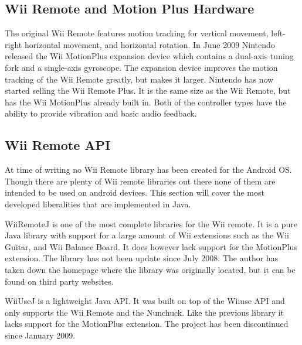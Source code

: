 \documentclass[11pt,twoside,a4paper]{report}
\begin{document}
\subsection{Wii Remote and Motion Plus Hardware}
The original Wii Remote features motion tracking for vertical movement, left-right horizontal movement, and horizontal rotation. %
In June 2009 %
Nintendo released the Wii MotionPlus expansion device which contains a dual-axis tuning fork and a single-axis gyroscope. %
The expansion device improves the motion tracking of the Wii Remote greatly, but makes it larger. Nintendo has now started selling the Wii Remote Plus. It is the same size as the Wii Remote, but has the Wii MotionPlus already built in. Both of the controller types have the ability to provide vibration and basic audio feedback.


\subsection{Wii Remote API}

At time of writing no Wii Remote library has been created for the Android OS. Though there are plenty of Wii remote libraries out there none of them are intended to be used on android devices. This section will cover the most developed liberalities that are implemented in Java.

WiiRemoteJ is one of the most complete libraries for the Wii remote. It is a pure Java library with support for a large amount of Wii extensions such as the Wii Guitar, and Wii Balance Board. It does however lack support for the MotionPlus extension. The library has not been update since July 2008. The author has taken down the homepage where the library was originally located, but it can be found on third party websites. %

WiiUseJ is a lightweight Java API. It was built on top of the Wiiuse API and only supports the Wii Remote and the Nunchuck. Like the previous library it lacks support for the MotionPlus extension. The project has been discontinued since January 2009. %
\end{document}
